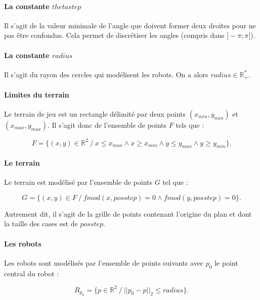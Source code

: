 \documentclass[12pt]{article}
\begin{document}
\paragraph{La constante $thetastep$} Il s'agit de la valeur minimale de l'angle que doivent former deux droites pour ne pas être confondus. Cela permet de discrétiser les angles (compris dans $]-\pi ; \pi]$).

\paragraph{La constante $radius$} Il s'agit du rayon des cercles qui modélisent les robots. On a alors $radius \in \mathbb{R}^*_+$.

\paragraph{Limites du terrain} Le terrain de jeu est un rectangle délimité par deux points $(x_{min}, y_{min})$ et $(x_{max}, y_{max})$. Il s'agit donc de l'ensemble de points $F$ tels que :

\begin{equation*}
F = \{ (x, y) \in \mathbb{R}^2 \ /\  x \leqslant x_{max} \wedge x \geqslant x_{min} \wedge y \leqslant y_{max} \wedge y \geqslant y_{min} \}.
\end{equation*}

\paragraph{Le terrain} Le terrain est modélisé par l'ensemble de points $G$ tel que :

\begin{equation*}
G = \{ (x, y) \in F \ /\  fmod(x, posstep) = 0 \wedge fmod(y, posstep) = 0 \}.
\end{equation*}

Autrement dit, il s'agit de la grille de points contenant l'origine du plan et dont la taille des cases est de $posstep$.

\paragraph{Les robots} Les robots sont modélisés par l'ensemble de points suivants avec $p_0$ le point central du robot :

\begin{equation*}
    R_{p_0} = \{ p \in \mathbb{R}^2 \ /\  ||p_0 - p||_2 \leqslant radius \}.
\end{equation*}
\end{document}
